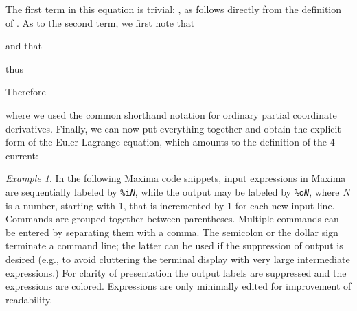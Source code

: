 \documentclass[twoside,reqno,11pt]{amsart}
\theoremstyle{definition}
\theoremstyle{remark}
\newtheorem*{ex}{Example}
\numberwithin{equation}{section}
\newcommand{\symb}[1]{{\tt #1}}
\begin{document}
The first term in this equation is trivial: , as follows directly from the definition of . As to the second term, we first note that


and that

thus

Therefore

where we used the common shorthand notation  for ordinary partial coordinate derivatives. Finally, we can now put everything together and obtain the explicit form of the Euler-Lagrange equation, which amounts to the definition of the 4-current:


\begin{ex}
In the following Maxima code snippets, input expressions in Maxima are sequentially labeled by \symb{\%i{\em N}}, while the output may be labeled by \symb{\%o{\em N}}, where {\em N} is a number, starting with 1, that is incremented by 1 for each new input line. Commands are grouped together between parentheses. Multiple commands can be entered by separating them with a comma. The semicolon or the dollar sign terminate a command line; the latter can be used if the suppression of output is desired (e.g., to avoid cluttering the terminal display with very large intermediate expressions.) For clarity of presentation the output labels are suppressed and the expressions are colored. Expressions are only minimally edited for improvement of readability.


\end{ex}
\end{document}

